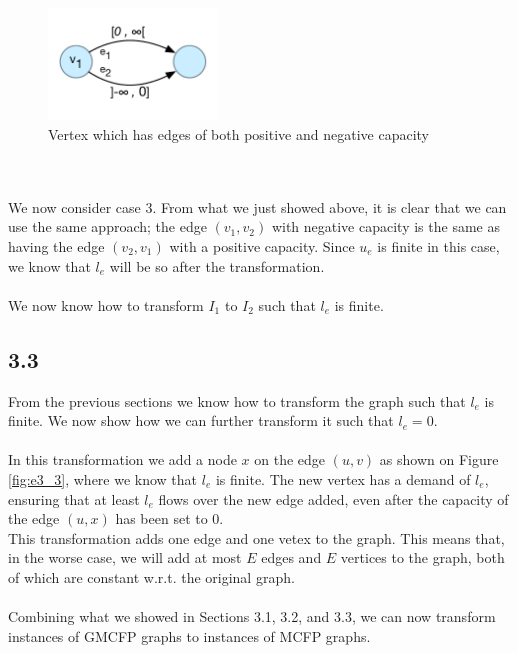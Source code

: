 \documentclass[12pt]{article}
\begin{document}
\begin{figure}[h]
  \centering
    \includegraphics[width=0.4\textwidth]{figures/e3_2_b}
  \caption{Vertex which has edges of both positive and negative capacity}
  \label{fig:e3_2_b}
\end{figure}~\\
\\
We now consider case 3. From what we just showed above, it is clear that we can use the same approach; the edge $(v_1, v_2)$ with negative capacity is the same as having the edge $(v_2, v_1)$ with a positive capacity. Since $u_e$ is finite in this case, we know that $l_e$ will be so after the transformation.\\
\\
We now know how to transform $I_1$ to $I_2$ such that $l_e$ is finite.

\subsection*{3.3}
From the previous sections we know how to transform the graph such that $l_e$ is finite. We now show how we can further transform it such that $l_e  = 0$.\\
\\
In this transformation we add a node $x$ on the edge $(u, v)$ as shown on Figure \ref{fig:e3_3}, where we know that $l_e$ is finite. The new vertex has a demand of $l_e$, ensuring that at least $l_e$ flows over the new edge added, even after the capacity of the edge $(u, x)$ has been set to 0.\\
This transformation adds one edge and one vetex to the graph. This means that, in the worse case, we will add at most $E$ edges and $E$ vertices to the graph, both of which are constant w.r.t. the original graph.\\
\\
Combining what we showed in Sections 3.1, 3.2, and 3.3, we can now transform instances of GMCFP graphs to instances of MCFP graphs.
\end{document}
